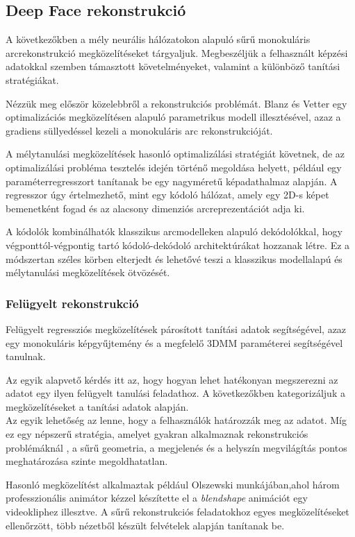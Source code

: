\documentclass[12pt,a4]{article}
\begin{document}
	\subsection{Deep Face rekonstrukció}
	
	 A következőkben a mély neurális hálózatokon alapuló sűrű monokuláris arcrekonstrukció megközelítéseket tárgyaljuk. Megbeszéljük
	a felhasznált képzési adatokkal szemben támasztott követelményeket, valamint a különböző tanítási
	stratégiákat. 
	
	
	Nézzük meg először közelebbről a rekonstrukciós problémát. \cite{blanzvetter}Blanz és Vetter egy optimalizációs megközelítésen alapuló parametrikus modell illesztésével, azaz a gradiens süllyedéssel kezeli a monokuláris arc rekonstrukcióját. 
	
	 A mélytanulási megközelítések hasonló optimalizálási stratégiát követnek, de az optimalizálási probléma 
	tesztelés idején történő megoldása helyett, például egy paraméterregresszort tanítanak be egy nagyméretű képadathalmaz alapján. A regresszor úgy értelmezhető, mint egy kódoló hálózat, amely egy 2D-s képet
	bemenetként fogad és az alacsony dimenziós arcreprezentációt adja ki. 
	
	A
	kódolók kombinálhatók klasszikus arcmodelleken alapuló dekódolókkal,
	hogy végponttól-végpontig tartó kódoló-dekódoló architektúrákat hozzanak létre.
	Ez a módszertan széles körben elterjedt és lehetővé teszi a klasszikus
	modellalapú és mélytanulási megközelítések ötvözését.
	
	\subsubsection{Felügyelt rekonstrukció}
	Felügyelt regressziós megközelítések
	párosított tanítási adatok segítségével, azaz egy monokuláris  képgyűjtemény
	és a megfelelő 3DMM paraméterei segítségével tanulnak.
	
	Az egyik alapvető kérdés itt az, hogy hogyan lehet hatékonyan megszerezni az adatot egy ilyen felügyelt tanulási feladathoz. A következőkben
	kategorizáljuk a megközelítéseket a
	tanítási adatok alapján. \\
	
	Az egyik lehetőség az lenne, hogy a felhasználók határozzák meg az adatot. Míg ez egy népszerű stratégia, amelyet gyakran alkalmaznak rekonstrukciós problémáknál \cite{saragih}, 
	a sűrű geometria, a megjelenés és a helyszín megvilágítás pontos meghatározása szinte megoldhatatlan.
	
	Hasonló megközelítést alkalmaztak például \cite{olszewski}Olszewski munkájában,ahol három professzionális animátor kézzel készítette el a \textit{blendshape} animációt egy videokliphez illesztve. A sűrű rekonstrukciós feladatokhoz egyes megközelítéseket ellenőrzött, több nézetből készült felvételek alapján tanítanak be.
	
\end{document}
